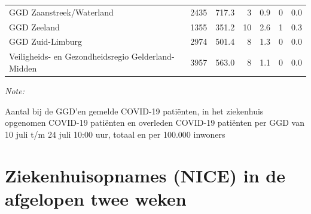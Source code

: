 \documentclass[
  english,
  man,floatsintext]{apa6}
\begin{document}
\begin{table}
\begin{threeparttable}
\begin{tabular}{lrrrrrr}
GGD Zaanstreek/Waterland & 2435 & 717.3 & 3 & 0.9 & 0 & 0.0\\
GGD Zeeland & 1355 & 351.2 & 10 & 2.6 & 1 & 0.3\\
GGD Zuid-Limburg & 2974 & 501.4 & 8 & 1.3 & 0 & 0.0\\
Veiligheids- en Gezondheidsregio Gelderland-Midden & 3957 & 563.0 & 8 & 1.1 & 0 & 0.0\\
\bottomrule
\end{tabular}
\begin{tablenotes}
\item \textit{Note: } 
\item Aantal bij de GGD’en gemelde COVID-19 patiënten, in het ziekenhuis opgenomen COVID-19 patiënten en overleden COVID-19 patiënten per GGD van 10 juli t/m 24 juli 10:00 uur, totaal en per 100.000 inwoners
\end{tablenotes}
\end{threeparttable}
\endgroup{}
\end{table}

\newpage

\hypertarget{ziekenhuisopnames-nice-in-de-afgelopen-twee-weken}{%
\section{Ziekenhuisopnames (NICE) in de afgelopen twee weken}\label{ziekenhuisopnames-nice-in-de-afgelopen-twee-weken}}
\end{document}
